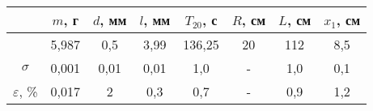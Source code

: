 \begin{tabular}{cccccccc}
\toprule
                 &$m$, г&$d$, мм&$l$, мм&$T_{20}$, с&$R$, см&$L$, см&$x_1$, см\\
\midrule
                 &5,987 &0,5    &3,99   &136,25   &20     &112    &8,5      \\
$\sigma$         &0,001 &0,01   &0,01   &1,0      &-      &1,0    &0,1      \\
$\varepsilon$, \%&0,017 &2      &0,3    &0,7      &-      &0,9    &1,2      \\
\bottomrule
\end{tabular}
